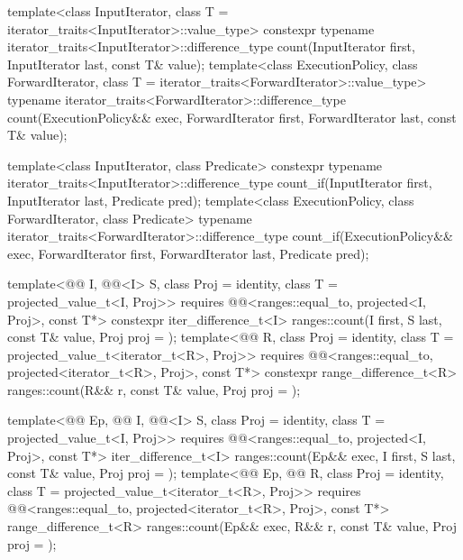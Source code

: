 %
%
\begin{itemdecl}
template<class InputIterator, class T = iterator_traits<InputIterator>::value_type>
  constexpr typename iterator_traits<InputIterator>::difference_type
    count(InputIterator first, InputIterator last, const T& value);
template<class ExecutionPolicy, class ForwardIterator,
         class T = iterator_traits<ForwardIterator>::value_type>
  typename iterator_traits<ForwardIterator>::difference_type
    count(ExecutionPolicy&& exec,
          ForwardIterator first, ForwardIterator last, const T& value);

template<class InputIterator, class Predicate>
  constexpr typename iterator_traits<InputIterator>::difference_type
    count_if(InputIterator first, InputIterator last, Predicate pred);
template<class ExecutionPolicy, class ForwardIterator, class Predicate>
  typename iterator_traits<ForwardIterator>::difference_type
    count_if(ExecutionPolicy&& exec,
             ForwardIterator first, ForwardIterator last, Predicate pred);

template<@@ I, @@<I> S, class Proj = identity,
         class T = projected_value_t<I, Proj>>
  requires @@<ranges::equal_to, projected<I, Proj>, const T*>
  constexpr iter_difference_t<I>
    ranges::count(I first, S last, const T& value, Proj proj = {});
template<@@ R, class Proj = identity, class T = projected_value_t<iterator_t<R>, Proj>>
  requires @@<ranges::equal_to, projected<iterator_t<R>, Proj>, const T*>
  constexpr range_difference_t<R>
    ranges::count(R&& r, const T& value, Proj proj = {});

template<@@ Ep, @@ I, @@<I> S,
         class Proj = identity, class T = projected_value_t<I, Proj>>
  requires @@<ranges::equal_to, projected<I, Proj>, const T*>
  iter_difference_t<I>
    ranges::count(Ep&& exec, I first, S last, const T& value, Proj proj = {});
template<@@ Ep, @@ R, class Proj = identity,
         class T = projected_value_t<iterator_t<R>, Proj>>
  requires @@<ranges::equal_to,
                                      projected<iterator_t<R>, Proj>, const T*>
  range_difference_t<R> ranges::count(Ep&& exec, R&& r, const T& value, Proj proj = {});


\end{itemdecl}
